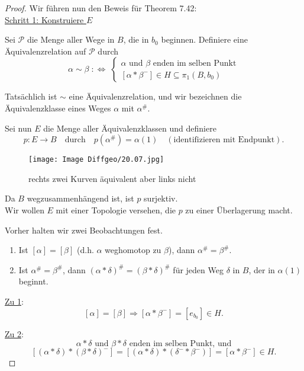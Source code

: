 \documentclass[fleqn, 12pt, letterpaper]{article}
\newcommand{\txt}[1]{\text{#1}}
\begin{document}
\begin{proof}
Wir führen nun den Beweis für Theorem 7.42:\\
\underline{Schritt 1: Konstruiere \( E \)}

Sei \(\mathcal{P}\) die Menge aller Wege in \(B\), die in \(b_0\) beginnen. Definiere eine Äquivalenzrelation auf \(\mathcal{P}\) durch
\[
\alpha \sim \beta \;:\Longleftrightarrow\;
\begin{cases}
\alpha \text{ und } \beta \text{ enden im selben Punkt} \\
[\alpha * \beta^-] \in H \subseteq \pi_1(B,b_0)
\end{cases}
\]

Tatsächlich ist \(\sim\) eine Äquivalenzrelation, und wir bezeichnen die Äquivalenzklasse eines Weges \(\alpha\) mit \(\alpha^{\#}\).

Sei nun \(E\) die Menge aller Äquivalenzklassen und definiere
\[
p : E \longrightarrow B \quad \text{durch} \quad p(\alpha^{\#}) = \alpha(1) \quad (\txt{identifizieren mit Endpunkt}).
\]
    \begin{figure}[H]
    \centering
    \texttt{[image: Image Diffgeo/20.07.jpg]}
	\caption{rechts zwei Kurven äquivalent aber links nicht}
 \end{figure}
Da \(B\) wegzusammenhängend ist, ist \(p\) surjektiv.\\

Wir wollen \(E\) mit einer Topologie versehen, die \(p\) zu einer Überlagerung macht.

Vorher halten wir zwei Beobachtungen fest.

\begin{enumerate}
\item Ist \([\alpha] = [\beta]\) (d.h. \(\alpha\) weghomotop zu \(\beta\)), dann \(\alpha^{\#} = \beta^{\#}\).
\item Ist \(\alpha^{\#} = \beta^{\#}\), dann \((\alpha * \delta)^{\#} = (\beta * \delta)^{\#}\) für jeden Weg \(\delta\) in \(B\), der in \(\alpha(1)\) beginnt.
\end{enumerate}

\underline{Zu 1}:  
\[
[\alpha] = [\beta] \Rightarrow [\alpha * {\beta}^-] = [e_{b_0}] \in H.
\]

\underline{Zu 2}:  
\[
\alpha * \delta \text{ und } \beta * \delta \text{ enden im selben Punkt, und}
\]
\[
[(\alpha * \delta) * (\beta * \delta)^{-}] = [(\alpha * \delta) * (\delta^{-} * \beta^{-})] = [\alpha * \beta^{-}] \in H.
\]




\end{proof}
\end{document}
